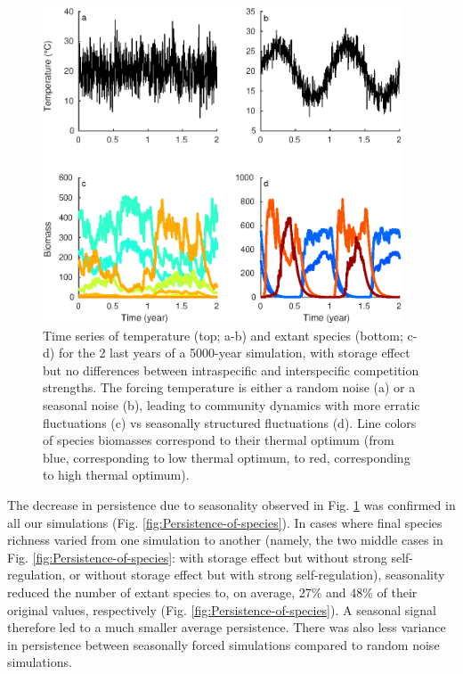 \documentclass[a4paper,12pt]{article}
\begin{document}
\begin{figure}[!ht]
\begin{centering}
\includegraphics[width=0.95\textwidth]{Fig1}
\par\end{centering}
\caption{Time series of temperature (top; a-b) and extant species (bottom;
c-d) for the 2 last years of a 5000-year simulation, with storage
effect but no differences between intraspecific and interspecific
competition strengths. The forcing temperature is either a random
noise (a) or a seasonal noise (b), leading to community dynamics with
more erratic fluctuations (c) vs seasonally structured fluctuations
(d). Line colors of species biomasses correspond to their thermal
optimum (from blue, corresponding to low thermal optimum, to red,
corresponding to high thermal optimum).\label{fig:Times-series_temperature_species}}
\end{figure}

The decrease in persistence due to seasonality observed in Fig. \ref{fig:Times-series_temperature_species}
was confirmed in all our simulations (Fig. \ref{fig:Persistence-of-species}).
In cases where final species richness varied from one simulation to
another (namely, the two middle cases in Fig. \ref{fig:Persistence-of-species}:
with storage effect but without strong self-regulation, or without
storage effect but with strong self-regulation), seasonality reduced
the number of extant species to, on average, 27\% and 48\% of their
original values, respectively (Fig. \ref{fig:Persistence-of-species}).
A seasonal signal therefore led to a much smaller average persistence.
There was also less variance in persistence between seasonally forced
simulations compared to random noise simulations.
\end{document}
